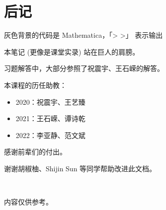 \section{后记}

灰色背景的代码是 Mathematica，「> >」 表示输出

本笔记 (更像是课堂实录) 站在巨人的肩膀。

习题解答中，大部分参照了祝震宇、王石嵘的解答。

本课程的历任助教：
\begin{itemize}
    \item 2020：祝震宇、王艺臻
    \item 2021：王石嵘、谭诗乾
    \item 2022：李亚静、范文斌
\end{itemize}

感谢前辈们的付出。

谢谢胡椒柚、Shijin Sun 等同学帮助改进此文档。

~

内容仅供参考。
